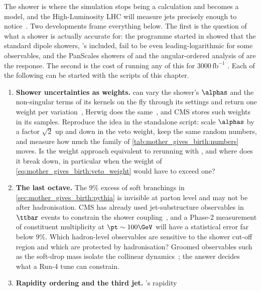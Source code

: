 The shower is where the simulation stops being a calculation and becomes a
model, and the High-Luminosity LHC will measure jets precisely enough to
notice~\cite{Azzi:2019yne}. Two developments frame everything below. The
first is the question of what a shower is actually accurate for: the
programme started in \cite{Dasgupta:2018nvj} showed that the standard
dipole showers, \PYTHIA's included, fail to be even leading-logarithmic
for some observables, and the PanScales showers of
\cite{Dasgupta:2020fwr,Hamilton:2020rcu,vanBeekveld:2022zhl,vanBeekveld:2023chs}
and the angular-ordered analysis of \cite{Bewick:2019rbu} are the response.
The second is the cost of running any of this for $3000\,\mathrm{fb}^{-1}$
\cite{HSFPhysicsEventGeneratorWG:2020gxw}. Each of the following can be
started with the scripts of this chapter.
\begin{enumerate}
  \item \textbf{Shower uncertainties as weights.} \PYTHIA can vary the
    shower's $\alphas$ and the non-singular terms of its kernels on the fly
    through its  settings and return one weight per
    variation~\cite{Mrenna:2016sih}, Herwig does the
    same~\cite{Bellm:2016rhh}, and CMS stores such weights in its samples.
    Reproduce the idea in the standalone script: scale $\alphas$ by a factor
    $\sqrt2$ up and down in the veto weight, keep the same random numbers,
    and measure how much the family \pt of
    \cref{tab:mother_gives_birth:numbers} moves. Is the weight approach
    equivalent to rerunning with , and where does it break
    down, in particular when the weight of \cref{eq:mother_gives_birth:veto_weight}
    would have to exceed one?
  \item \textbf{The last octave.} The $9\%$ excess of soft branchings in
    \cref{sec:mother_gives_birth:pythia} is invisible at parton level and
    may not be after hadronisation. CMS has already used jet-substructure
    observables in $\ttbar$ events to constrain the shower
    coupling~\cite{CMS:2018ypj}, and a Phase-2 measurement of constituent
    multiplicity at $\pt\sim100\GeV$ will have a statistical error far
    below $9\%$. Which hadron-level observables are sensitive to the shower
    cut-off region and which are protected by hadronisation? Groomed
    observables such as the soft-drop mass isolate the collinear
    dynamics~\cite{Anderle:2020mxj}; the answer decides what a Run-4 tune
    can constrain.
  \item \textbf{Rapidity ordering and the third jet.} \PYTHIA's rapidity

\end{enumerate}
